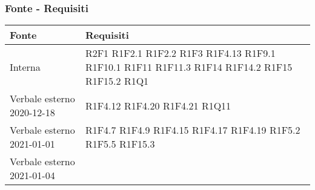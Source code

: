 \subsubsection{Fonte - Requisiti}
\begin{center}
	\begin{longtable}{|p{44mm}|p{22mm}|}
		\hline
		\rowcolor{lighter-grayer}
		\textbf{Fonte} &  \textbf{Requisiti}  \\
		\hline
		\endhead
		
		
		
		 Interna & 
		 R2F1 \newline
		 	R1F2.1 \newline
		 	R1F2.2 \newline
			R1F3 \newline 	 
			R1F4.13 \newline
			R1F9.1 \newline
			R1F10.1 \newline
			R1F11 \newline
			R1F11.3 \newline
			R1F14 \newline
			R1F14.2 \newline
			R1F15 \newline
			R1F15.2 \newline
			R1Q1
	    \\
		\hline
		Verbale esterno 2020-12-18 & 
		
			R1F4.12 \newline
			R1F4.20 \newline
			R1F4.21 \newline
			R1Q11
	\\
	\hline
	Verbale esterno 2021-01-01 & 
		R1F4.7 \newline
		R1F4.9 \newline
		R1F4.15 \newline
		R1F4.17 \newline
		R1F4.19 \newline
		R1F5.2 \newline
		R1F5.5 \newline
		R1F15.3
\\
\hline
Verbale esterno 2021-01-04 & 


\end{longtable}
\end{center}
